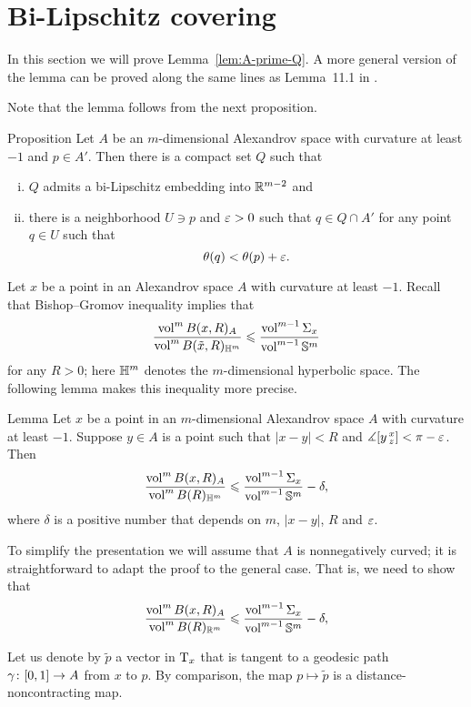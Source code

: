 \section{Bi-Lipschitz covering}\label{sec:bilip}

In this section we will prove Lemma~\ref{lem:A-prime-Q}.
A more general version of the lemma can be proved along the same lines as Lemma~11.1 in \cite{simon}.

Note that the lemma follows from the next proposition.


\begin{thm}{Proposition}\label{prop:Q-covering}
Let $A$ be an $m$-dimensional Alexandrov space with curvature at least $-1$ and $p\in A'$.
Then there is a compact set $Q$ such that 
\begin{enumerate}[(i)]
 \item $Q$ admits a bi-Lipschitz embedding into $\mathbb{R}^{m-2}$ and
 \item there is a neighborhood $U\ni p$ and $\varepsilon>0$ such that $q\in Q\cap A'$ for any point $q\in U$ such that 
 \[\theta(q)<\theta(p)+\varepsilon.\]
\end{enumerate}
\end{thm}

Let $x$ be a point in an Alexandrov space $A$ with curvature at least $-1$.
Recall that Bishop--Gromov inequality implies that 
\[\frac{\operatorname{vol}^m B(x,R)_A}{\operatorname{vol}^m B(\tilde x,R)_{\mathbb{H}^m}}\leqslant \frac{\operatorname{vol}^{m-1} \Sigma_x}{\operatorname{vol}^{m-1} \mathbb{S}^m}\]
for any $R>0$; here $\mathbb{H}^m$ denotes the $m$-dimensional hyperbolic space.
The following lemma makes this inequality more precise. 

\begin{thm}{Lemma}
Let $x$ be a point in an $m$-dimensional Alexandrov space $A$ with curvature at least $-1$.
Suppose $y\in A$ is a point such that $|x-y|<R$ and $\measuredangle[y\,{}^{x}_{z}]<\pi-\varepsilon$.
Then
\[\frac{\operatorname{vol}^m B(x,R)_A}{\operatorname{vol}^m B(R)_{\mathbb{H}^m}}\leqslant \frac{\operatorname{vol}^{m-1} \Sigma_x}{\operatorname{vol}^{m-1} \mathbb{S}^m}-\delta,\]
where $\delta$ is a positive number that depends on $m$, $|x-y|$, $R$ and $\varepsilon$.
 
\end{thm}

To simplify the presentation we will assume that $A$ is nonnegatively curved;
it is straightforward to adapt the proof to the general case.
That is, we need to show that 
\[\frac{\operatorname{vol}^m B(x,R)_A}{\operatorname{vol}^m B(R)_{\mathbb{R}^m}}\leqslant \frac{\operatorname{vol}^{m-1} \Sigma_x}{\operatorname{vol}^{m-1} \mathbb{S}^m}-\delta,\]

Let us denote by $\tilde p$ a vector in $\mathrm{T}_x$ that is tangent to a geodesic path $\gamma\:[0,1]\zz\to A$ from $x$ to $p$.
By comparison, the map $p\mapsto \tilde p$ is a distance-noncontracting map.

